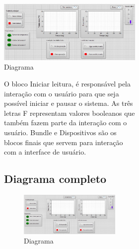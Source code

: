 \begin{figure}[!htb]
\begin{figure}[!htb]

\begin{figure}[!htb]                                                               
    \centering                                                                      
    \includegraphics[scale=0.6, keepaspectratio=true]{figuras/labview_1.eps} 
    \caption{Diagrama }
 \end{figure}
 \newpage\begin{figure}[!htb] 

O bloco Iniciar leitura, é responsável pela interação com o usuário para que seja possível iniciar e pausar o sistema. As três letras F representam valores booleanos que também fazem parte da interação com o usuário.
    Bundle e Dispositivos são os blocos finais que servem para interação com a interface de usuário.

\subsection{Diagrama completo}

\begin{figure}[!htb]                                                               
    \centering                                                                      
    \includegraphics[scale=0.6, keepaspectratio=true]{figuras/labview_1.eps} 
    \caption{Diagrama }
 \end{figure}
 \newpage\begin{figure}[!htb] 


\end{figure}
\end{figure}
\end{figure}
\end{figure}
